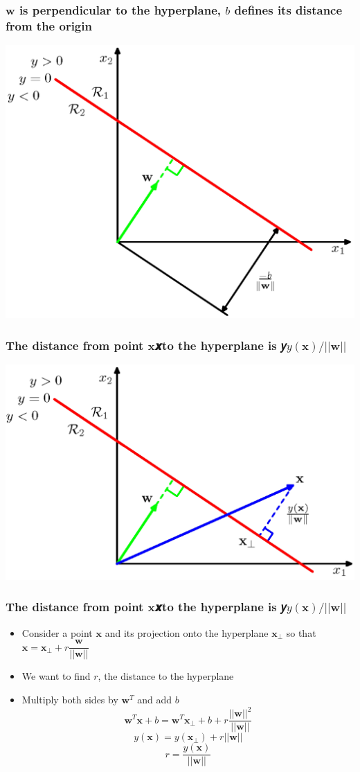 \documentclass[12pt,notes,mathserif]{beamer}
\begin{document}
\begin{frame}[c]
\frametitle{$\mathbf{w}$ is perpendicular to the hyperplane, $b$ defines its distance from the origin}
\begin{center}
\includegraphics[width=0.7\linewidth]{fig8/lec815.jpg}
\end{center}
\end{frame}


\begin{frame}[c]
\frametitle{The distance from point $\mathbf{x}$𝒙to the hyperplane is 𝑦$y(\mathbf{x})/||\mathbf{w}||$}
\begin{center}
\includegraphics[width=0.7\linewidth]{fig8/lec816.jpg}
\end{center}
\end{frame}



\begin{frame}[c]
\frametitle{The distance from point $\mathbf{x}$𝒙to the hyperplane is 𝑦$y(\mathbf{x})/||\mathbf{w}||$}
\begin{itemize}
\item Consider a point $\mathbf{x}$ and its projection onto the hyperplane $\mathbf{x}_{\bot}$ so that $\mathbf{x}=\mathbf{x}_{\bot}+r\dfrac{\mathbf{w}}{||\mathbf{w}||}$
\item We want to find $r$, the distance to the hyperplane
\item Multiply both sides by $\mathbf{w}^T$ and add $b$
\[
\mathbf{w}^T\mathbf{x}+b=
\mathbf{w}^T\mathbf{x}_{\bot} +b+r\dfrac{||\mathbf{w}||^2}{||\mathbf{w}||} 
\]
\[
y(\mathbf{x})=y(\mathbf{x}_{\bot})+r||\mathbf{w}||
\]
\[
r=\dfrac{y(\mathbf{x})}{||\mathbf{w}||}
\]
\end{itemize}
\end{frame}
\end{document}
